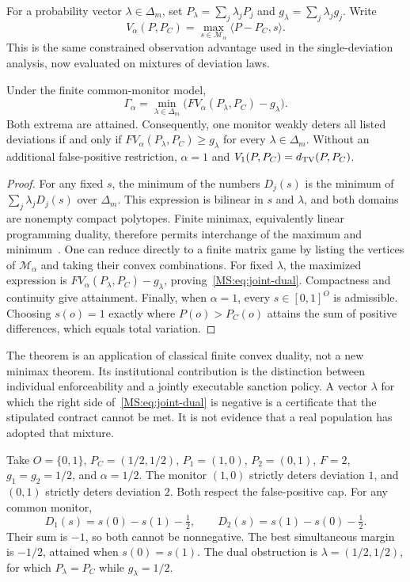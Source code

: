 For a probability vector $\lambda\in\Delta_m$, set $P_\lambda=\sum_j\lambda_jP_j$ and $g_\lambda=\sum_j\lambda_jg_j$. Write
\[
V_\alpha(P,P_C)=\max_{s\in\mathcal M_\alpha}\langle P-P_C,s\rangle.
\]
This is the same constrained observation advantage used in the single-deviation analysis, now evaluated on mixtures of deviation laws.

\begin{MStheorem}\label{MS:thm:joint-enforcement}
Under the finite common-monitor model,
\begin{equation}\label{MS:eq:joint-dual}
\Gamma_\alpha=\min_{\lambda\in\Delta_m}
\bigl(FV_\alpha(P_\lambda,P_C)-g_\lambda\bigr).
\end{equation}
Both extrema are attained. Consequently, one monitor weakly deters all listed deviations if and only if $FV_\alpha(P_\lambda,P_C)\geq g_\lambda$ for every $\lambda\in\Delta_m$. Without an additional false-positive restriction, $\alpha=1$ and $V_1(P,P_C)=d_{\mathrm{TV}}(P,P_C)$.
\end{MStheorem}
\begin{proof}
For any fixed $s$, the minimum of the numbers $D_j(s)$ is the minimum of $\sum_j\lambda_jD_j(s)$ over $\Delta_m$. This expression is bilinear in $s$ and $\lambda$, and both domains are nonempty compact polytopes. Finite minimax, equivalently linear programming duality, therefore permits interchange of the maximum and minimum~\cite{MS:boydconvex}. One can reduce directly to a finite matrix game by listing the vertices of $\mathcal M_\alpha$ and taking their convex combinations. For fixed $\lambda$, the maximized expression is $FV_\alpha(P_\lambda,P_C)-g_\lambda$, proving~\eqref{MS:eq:joint-dual}. Compactness and continuity give attainment. Finally, when $\alpha=1$, every $s\in[0,1]^O$ is admissible. Choosing $s(o)=1$ exactly where $P(o)>P_C(o)$ attains the sum of positive differences, which equals total variation.
\end{proof}

The theorem is an application of classical finite convex duality, not a new minimax theorem. Its institutional contribution is the distinction between individual enforceability and a jointly executable sanction policy. A vector $\lambda$ for which the right side of~\eqref{MS:eq:joint-dual} is negative is a certificate that the stipulated contract cannot be met. It is not evidence that a real population has adopted that mixture.

\begin{MScounterexample}\label{MS:ex:pairwise-enforcement}
Take $O=\{0,1\}$, $P_C=(1/2,1/2)$, $P_1=(1,0)$, $P_2=(0,1)$, $F=2$, $g_1=g_2=1/2$, and $\alpha=1/2$. The monitor $(1,0)$ strictly deters deviation $1$, and $(0,1)$ strictly deters deviation $2$. Both respect the false-positive cap. For any common monitor,
\[
D_1(s)=s(0)-s(1)-\tfrac12,
\qquad
D_2(s)=s(1)-s(0)-\tfrac12.
\]
Their sum is $-1$, so both cannot be nonnegative. The best simultaneous margin is $-1/2$, attained when $s(0)=s(1)$. The dual obstruction is $\lambda=(1/2,1/2)$, for which $P_\lambda=P_C$ while $g_\lambda=1/2$.
\end{MScounterexample}

